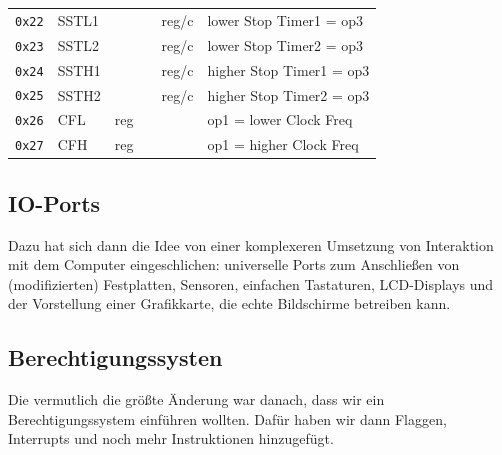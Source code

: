 \documentclass{scrartcl}
\begin{document}
\begin{center}
\begin{table}
\begin{tabular}{l | l l l l | l}
                \texttt{0x22} & SSTL1 & & & reg/c & lower Stop Timer1 = op3 \\
                \texttt{0x23} & SSTL2 & & & reg/c & lower Stop Timer2 = op3 \\
                \texttt{0x24} & SSTH1 & & & reg/c & higher Stop Timer1 = op3 \\
                \texttt{0x25} & SSTH2 & & & reg/c & higher Stop Timer2 = op3 \\
                \texttt{0x26} & CFL  & reg & & & op1 = lower Clock Freq \\
                \texttt{0x27} & CFH  & reg & & & op1 = higher Clock Freq \\
                \hline
            \end{tabular}
        \end{table}
    \end{center}

    \subsection{IO-Ports}
    Dazu hat sich dann die Idee von einer komplexeren Umsetzung von Interaktion mit dem Computer eingeschlichen:
    universelle Ports zum Anschließen von (modifizierten) Festplatten, Sensoren, einfachen Tastaturen, LCD-Displays und der Vorstellung einer Grafikkarte, die echte Bildschirme betreiben kann.

        \vspace{-5pt}

    \subsection{Berechtigungssysten}
    Die vermutlich die größte Änderung war danach, dass wir ein Berechtigungssystem einführen wollten.
    Dafür haben wir dann Flaggen, Interrupts und noch mehr Instruktionen hinzugefügt.
\end{document}
